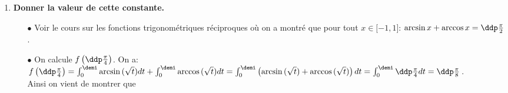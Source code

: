 \documentclass[a4paper, 11pt,reqno]{article}
\begin{document}
\begin{correction}
\begin{enumerate}
\begin{itemize}
			      \item[$\bullet$] Puis en utilisant la sym\'etrie par rapport \`{a} l'axe des ordonn\'ees et la translation de vecteur $\pi \vect{i}$, on obtient que 
		      \end{itemize}
		\item \textbf{Donner la valeur de cette constante.}
		      \begin{itemize}
			      \item[$\bullet$] Voir le cours sur les fonctions trigonom\'etriques r\'eciproques o\`{u} on a montr\'e que pour tout $x\in\lbrack -1,1\rbrack$: $\arcsin{x}+\arccos{x}=\ddp\frac{\pi}{2}$.
			      \item[$\bullet$] On calcule $f\left( \ddp\frac{\pi}{4}\right)$. On a: $f\left( \ddp\frac{\pi}{4}\right)=\int_0^{\demi} \arcsin{(\sqrt{t})}dt+\int_0^{\demi} \arccos{(\sqrt{t})} dt=\int_0^{\demi} \left(\arcsin{(\sqrt{t})} +\arccos{(\sqrt{t})}  \right)dt=\int_0^{\demi}  \ddp\frac{\pi}{4} dt=\ddp\frac{\pi}{8}$.\\
			            \noindent Ainsi on vient de montrer que 
		      \end{itemize}
	\end{enumerate}
\end{correction}
\end{document}
